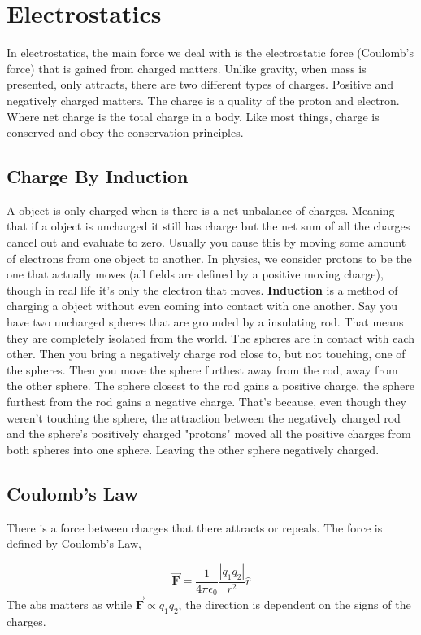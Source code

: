\chapter{Electrostatics}
In electrostatics, the main force we deal with is the electrostatic force (Coulomb's force) that is gained from charged matters. Unlike gravity, when mass is presented, only attracts, there are two different types of charges. Positive and negatively charged matters. The charge is a quality of the proton and electron. Where net charge is the total charge in a body. Like most things, charge is conserved and obey the conservation principles.   

\section{Charge By Induction}
A object is only charged when is there is a net unbalance of charges. 
Meaning that if a object is uncharged it still has charge but the net sum of all the charges cancel out and evaluate to zero. Usually you cause this by moving some amount of electrons from one object to another. In physics, we consider protons to be the one that actually moves (all fields are defined by a positive moving charge), though in real life it's only the electron that moves. \textbf{Induction} is a method of charging a object without even coming into contact with one another. Say you have two uncharged spheres that are 
grounded by a insulating rod. That means they are completely isolated from the world. The spheres are in contact with each other. Then you bring a negatively charge rod close to, but not touching, one of the spheres. Then you move the sphere furthest away 
from the rod, away from the other sphere. The sphere closest to the rod gains a positive charge, the sphere furthest from the rod gains a negative charge. That's because, even though they weren't touching the sphere, the attraction between the negatively 
charged rod and the sphere's positively charged "protons" moved all the positive charges from both spheres into one sphere. Leaving the other sphere negatively charged. 

\section{Coulomb's Law}
There is a force between charges that there attracts or repeals. The force is defined by Coulomb's Law,

\begin{equation*}
	\vec{\mathbf{F}} = \frac{1}{4\pi\epsilon_0} \frac{|q_1q_2|}{r^2} \hat{r}
\end{equation*}
The abs matters as while $\vec{\mathbf{F}} \propto q_1q_2$, the direction is dependent on the signs of the charges. 

